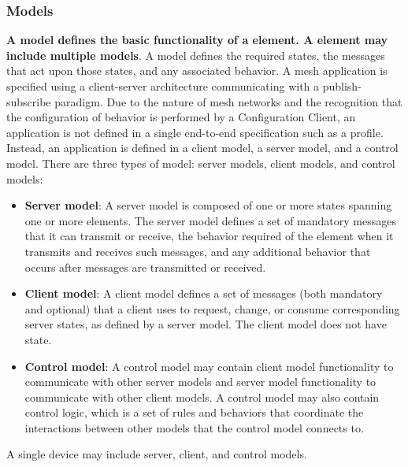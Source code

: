 \documentclass[\main/main.tex]{subfiles}
\begin{document}
\subsubsection{Models}
\textbf{A model defines the basic functionality of a element. A element may include multiple models}. A model defines the required states, the messages that act upon those states, and any associated behavior. 
\newline\newline
A mesh application is specified using a client-server architecture communicating with a publish-subscribe paradigm. Due to the nature of mesh networks and the recognition that the configuration of behavior is performed by a Configuration Client, an application is not defined in a single end-to-end specification such as a profile. Instead, an application is defined in a client model, a server model, and a control model.
\newline\newline
There are three types of model: server models, client models, and control models:
\begin{itemize}
    \item \textbf{Server model}: A server model is composed of one or more states spanning one or more elements. The server model defines a set of mandatory messages that it can transmit or receive, the behavior required of the element when it transmits and receives such messages, and any additional behavior that occurs after messages are transmitted or received.
    \item \textbf{Client model}: A client model defines a set of messages (both mandatory and optional) that a client uses to request, change, or consume corresponding server states, as defined by a server model. The client model does not have state.
    \item \textbf{Control model}: A control model may contain client model functionality to communicate with other server models and server model functionality to communicate with other client models. A control model may also contain control logic, which is a set of rules and behaviors that coordinate the interactions between other models that the control model connects to.
\end{itemize}
A single device may include server, client, and control models.
\end{document}
